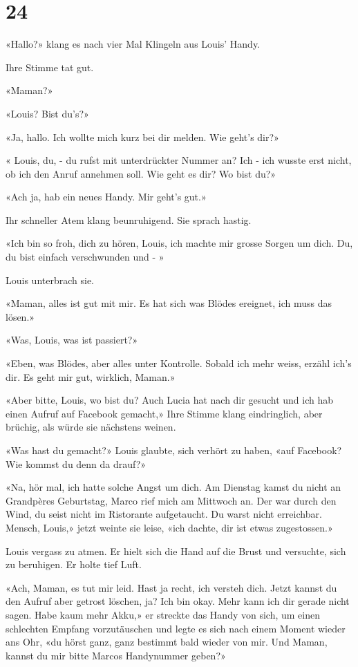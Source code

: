 \chapter{24}



«Hallo?» klang es nach vier Mal Klingeln aus Louis’ Handy.

Ihre Stimme tat gut.

«Maman?»

«Louis? Bist du’s?»

«Ja, hallo. Ich wollte mich kurz bei dir melden. Wie geht’s dir?»

« Louis, du, - du rufst mit unterdrückter Nummer an? Ich -  ich wusste erst nicht, ob ich den Anruf annehmen soll. Wie geht es dir? Wo bist du?»

«Ach ja, hab ein neues Handy. Mir geht’s gut.»

Ihr schneller Atem klang beunruhigend. Sie sprach hastig.

«Ich bin so froh, dich zu hören, Louis, ich machte mir grosse Sorgen um
dich. Du, du bist einfach verschwunden und - »

Louis unterbrach sie.

«Maman, alles ist gut mit mir. Es hat sich was Blödes ereignet, ich muss
das lösen.»

«Was, Louis, was ist passiert?»

«Eben, was Blödes, aber alles unter Kontrolle. Sobald ich mehr weiss,
erzähl ich’s dir. Es geht mir gut, wirklich, Maman.»

«Aber bitte, Louis, wo bist du? Auch Lucia hat nach dir gesucht und ich
hab einen Aufruf auf Facebook gemacht,» Ihre Stimme klang eindringlich,
aber brüchig, als würde sie nächstens weinen.

«Was hast du gemacht?» Louis glaubte, sich verhört zu haben, «auf
Facebook? Wie kommst du denn da drauf?»

«Na, hör mal, ich hatte solche Angst um dich. Am Dienstag kamst du nicht
an Grandpères Geburtstag, Marco rief mich am Mittwoch an. Der war durch
den Wind, du seist nicht im Ristorante aufgetaucht. Du warst nicht
erreichbar. Mensch, Louis,» jetzt weinte sie leise, «ich dachte, dir
ist etwas zugestossen.»

Louis vergass zu atmen. Er hielt sich die Hand auf die Brust und
versuchte, sich zu beruhigen. Er holte tief Luft.

«Ach, Maman, es tut mir leid. Hast ja recht, ich versteh dich. Jetzt
kannst du den Aufruf aber getrost löschen, ja? Ich bin okay. Mehr kann
ich dir gerade nicht sagen. Habe kaum mehr Akku,» er streckte das Handy von sich, um einen schlechten Empfang vorzutäuschen und legte es sich nach einem Moment wieder ans Ohr, «du hörst
ganz, ganz bestimmt bald wieder von mir. Und Maman, kannst du mir bitte Marcos Handynummer geben?»

